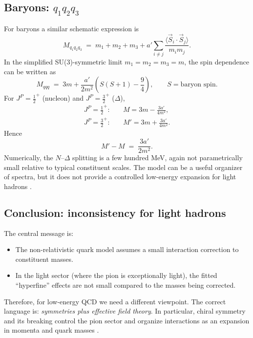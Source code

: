 \subsection{Baryons: $q_1 q_2 q_3$}

For baryons a similar schematic expression is
\begin{equation}
M_{q_1 q_2 q_3} \;=\; m_1+m_2+m_3
+a'\sum_{i\neq j}\frac{\langle \vec S_i\cdot \vec S_j\rangle}{m_i m_j}.
\label{eq:baryon_mass_general}
\end{equation}
In the simplified SU(3)-symmetric limit $m_1=m_2=m_3=m$,
the spin dependence can be written as
\begin{equation}
M_{qqq} \;=\; 3m+\frac{a'}{2m^2}\left(S(S+1)-\frac{9}{4}\right),
\qquad S=\text{baryon spin}.
\label{eq:baryon_mass_simplified}
\end{equation}
For $J^P=\tfrac12^+$ (nucleon) and $J^P=\tfrac32^+$ ($\Delta$),
\begin{align}
J^P=\frac12^+:\quad & M = 3m - \frac{3a'}{4m^2},
\\
J^P=\frac32^+:\quad & M' = 3m + \frac{3a'}{4m^2}.
\end{align}
Hence
\begin{equation}
M'-M \;=\; \frac{3a'}{2m^2}.
\label{eq:baryon_split_scale}
\end{equation}
Numerically, the $N$--$\Delta$ splitting is a few hundred MeV, again not parametrically small
relative to typical constituent scales. The model can be a useful organizer of spectra,
but it does not provide a controlled low-energy expansion for light hadrons
\citep{halzen1984,griffiths2008,thomson2013}.

\subsection{Conclusion: inconsistency for light hadrons}

The central message is:
\begin{itemize}
  \item The non-relativistic quark model assumes a small interaction correction to constituent masses.
  \item In the light sector (where the pion is exceptionally light), the fitted ``hyperfine''
  effects are not small compared to the masses being corrected.
\end{itemize}
Therefore, for low-energy QCD we need a different viewpoint. The correct language is:
\emph{symmetries plus effective field theory}. In particular, chiral symmetry and its breaking
control the pion sector and organize interactions as an expansion in momenta and quark masses
\citep{peskin1995,weinberg1995qtf1,schwartz2014,donoghue1992}.

